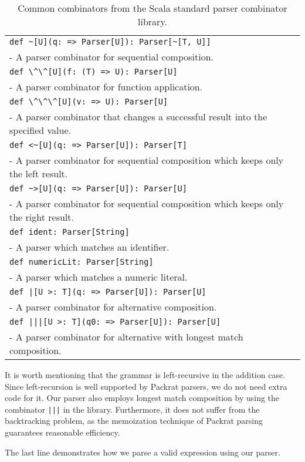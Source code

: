 \begin{table}
\begin{tabularx}{\linewidth}{X}
\hline
\lstinline{def ~[U](q: => Parser[U]): Parser[~[T, U]]} \\
- A parser combinator for sequential composition. \\ \hline
\lstinline{def \^\^[U](f: (T) => U): Parser[U]} \\
- A parser combinator for function application. \\ \hline
\lstinline{def \^\^\^[U](v: => U): Parser[U]} \\
- A parser combinator that changes a successful result into the specified value. \\ \hline
\lstinline{def <~[U](q: => Parser[U]): Parser[T]} \\
- A parser combinator for sequential composition which keeps only the left result. \\ \hline
\lstinline{def ~>[U](q: => Parser[U]): Parser[U]} \\
- A parser combinator for sequential composition which keeps only the right result. \\ \hline
\lstinline{def ident: Parser[String]} \\
- A parser which matches an identifier. \\ \hline
\lstinline{def numericLit: Parser[String]} \\
- A parser which matches a numeric literal. \\ \hline
\lstinline{def |[U >: T](q: => Parser[U]): Parser[U]} \\
- A parser combinator for alternative composition. \\ \hline
\lstinline{def |||[U >: T](q0: => Parser[U]): Parser[U]} \\
- A parser combinator for alternative with longest match composition. \\ \hline
\end{tabularx}
\caption{Common combinators from the Scala standard parser combinator library.}\label{tab:packrat}
\end{table}

It is worth mentioning that the grammar is left-recursive in the addition case. Since left-recursion is well supported by Packrat parsers, we do not need extra code for it. Our parser also employs longest match composition by using the combinator \lstinline{|||} in the library. Furthermore, it does not suffer from the backtracking problem, as the memoization technique of Packrat parsing guarantees reasonable efficiency.

The last line demonstrates how we parse a valid expression  using our parser.

